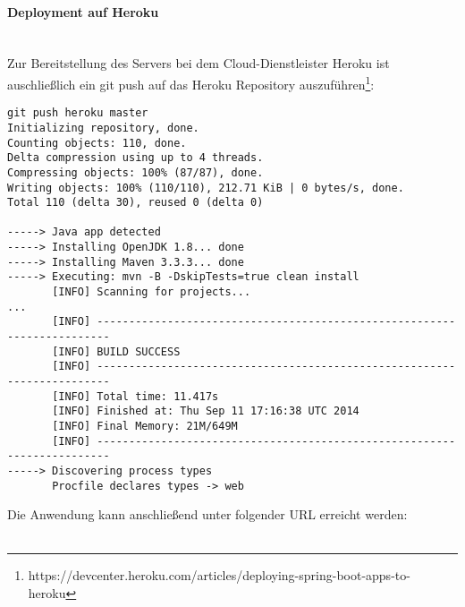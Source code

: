 \paragraph{Deployment auf Heroku}\mbox{}\\
Zur Bereitstellung des Servers bei dem Cloud-Dienstleister Heroku ist auschließlich ein git push auf das Heroku Repository auszuführen\footnote{https://devcenter.heroku.com/articles/deploying-spring-boot-apps-to-heroku}:
\vspace{2em}
\begin{lstlisting}
git push heroku master
Initializing repository, done.
Counting objects: 110, done.
Delta compression using up to 4 threads.
Compressing objects: 100% (87/87), done.
Writing objects: 100% (110/110), 212.71 KiB | 0 bytes/s, done.
Total 110 (delta 30), reused 0 (delta 0)

-----> Java app detected
-----> Installing OpenJDK 1.8... done
-----> Installing Maven 3.3.3... done
-----> Executing: mvn -B -DskipTests=true clean install
       [INFO] Scanning for projects...
...
       [INFO] ------------------------------------------------------------------------
       [INFO] BUILD SUCCESS
       [INFO] ------------------------------------------------------------------------
       [INFO] Total time: 11.417s
       [INFO] Finished at: Thu Sep 11 17:16:38 UTC 2014
       [INFO] Final Memory: 21M/649M
       [INFO] ------------------------------------------------------------------------
-----> Discovering process types
       Procfile declares types -> web

\end{lstlisting}
\vspace{2em}
Die Anwendung kann anschließend unter folgender URL erreicht werden:\\
\\